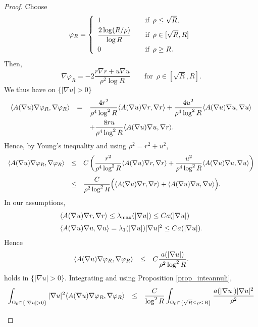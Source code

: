\documentclass[10 pt,a4paper]{article}
\theoremstyle{definition}
\begin{document}
\begin{proof}
	Choose 
	$$
	\varphi_R = \left\{ \begin{array}{ll}
		1 & \quad \text{if } \, \rho \le \sqrt{R}, \\[0.1cm]
		\disp \frac{2\log (R/\rho)}{\log R} & \quad \text{if } \, \rho \in [\sqrt{R},R] \\[0.3cm]
		0 & \quad \text{if } \, \rho \ge R.
	\end{array}\right.
	$$
	Then, 
	$$
	\nabla \varphi_R = -2\frac{r\nabla r+ u\nabla u}{\rho^2 \log R} \qquad \text{for } \, \rho \in [\sqrt{R},R].
	$$
	We thus have on $\{|\nabla u|>0\}$
	$$
	\begin{array}{lcl}
		\disp \langle A(\nabla u) \nabla \varphi_R, \nabla \varphi_R \rangle & = & \disp \frac{4r^2}{\rho^4 \log^2 R}\langle A(\nabla u)\nabla r, \nabla r\rangle +  \frac{4u^2}{\rho^4 \log^2 R} \langle A(\nabla u) \nabla u, \nabla u\rangle \\[0.4cm]
		& & \disp + \frac{8r u}{\rho^4 \log^2R} \langle A(\nabla u)\nabla u, \nabla r\rangle.
	\end{array}
	$$
	Hence, by Young's inequality and using $\rho^2 = r^2 + u^2$, 
	$$
	\begin{array}{lcl}
		\disp \langle A(\nabla u) \nabla \varphi_R, \nabla \varphi_R \rangle & \le & \disp C \left(\frac{r^2}{\rho^4 \log^2 R}\langle A(\nabla u)\nabla r, \nabla r\rangle +  \frac{u^2}{\rho^4 \log^2 R} \langle A(\nabla u) \nabla u, \nabla u\rangle\right) \\[0.5cm]
		& \le & \disp \frac{C}{\rho^2 \log^2 R} \Big(\langle A(\nabla u)\nabla r, \nabla r\rangle + \langle A(\nabla u) \nabla u, \nabla u\rangle\Big).
	\end{array}
	$$
	In our assumptions, 
	$$
	\begin{array}{lcl}
		\disp \langle A(\nabla u)\nabla r, \nabla r\rangle \le \lambda_{\max}(|\nabla u|) \le C \aaa \\[0.2cm]
		\langle A(\nabla u) \nabla u, \nabla u\rangle = \lambda_1(|\nabla u|)|\nabla u|^2 \le C\aaa.
	\end{array}
	$$
	Hence 
	$$
	\begin{array}{lcl}
		\disp \langle A(\nabla u) \nabla \varphi_R, \nabla \varphi_R \rangle & \le & \disp C\frac{\aaa}{\rho^2 \log^2 R}.
	\end{array}
	$$
	holds in $\{|\nabla u|>0\}$. Integrating and using Proposition \ref{prop_inteannuli}, 
	$$
	\begin{array}{lcl}
		\disp \int_{\Omega_0 \cap \{|\nabla u|>0\}} |\nabla u|^2 \langle A(\nabla u) \nabla \varphi_R, \nabla \varphi_R \rangle & \le & \disp \frac{C}{\log^2 R} \int_{\Omega_0 \cap \{\sqrt{R} \le \rho \le R\}} \frac{\aaa |\nabla u|^2}{\rho^2} \\[0.5cm]

\end{array}$$
\end{proof}
\end{document}
